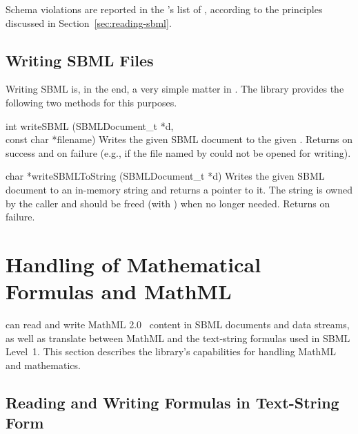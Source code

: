 \documentclass{sbmlmanual}
\begin{document}
Schema violations are reported in the 's list of
, according to the principles discussed in
Section~\ref{sec:reading-sbml}.


\subsection{Writing SBML Files}
\label{sec:writing-sbml}

Writing SBML is, in the end, a very simple matter in \libsbml{}.  The
library provides the following two methods for this purposes.


\begin{methoddef}{int writeSBML (SBMLDocument\_t *d, \\const char *filename)}
  Writes the given SBML document to the given .  Returns
   on success and  on failure (e.g., if the file named by
   could not be opened for writing).
\end{methoddef}


\begin{methoddef}{char *writeSBMLToString (SBMLDocument\_t *d)}
  Writes the given SBML document to an in-memory string and returns a
  pointer to it.  The string is owned by the caller and should be freed
  (with ) when no longer needed.  Returns  on
  failure.
\end{methoddef}



\section{Handling of Mathematical Formulas and MathML}
\label{sec:mathml}

\libsbml{} can read and write MathML 2.0~\citep{ausbrooks_2001b} content in
SBML documents and data streams, as well as translate between MathML and
the text-string formulas used in SBML Level~1.  This section describes the
library's capabilities for handling MathML and mathematics.

\subsection{Reading and Writing Formulas in Text-String Form}
\label{sec:text-string-math}
\end{document}
